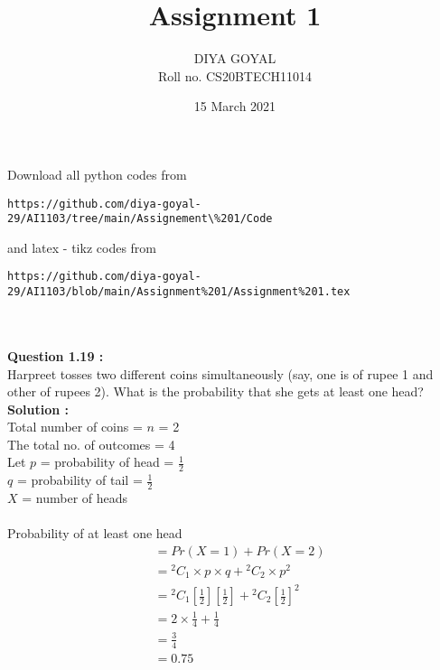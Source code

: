 \documentclass[journal,12pt,twocolumn]{IEEEtran}
\title{Assignment 1}
\author{DIYA GOYAL\\
Roll no. CS20BTECH11014}
\date{15 March 2021}
\newcommand{\fbrack}[2]{\genfrac{[}{]}{}{}{#1}{#2}}
\begin{document}
\maketitle
\large Download all python codes from\\
\begin{lstlisting}
https://github.com/diya-goyal-29/AI1103/tree/main/Assignement\%201/Code
\end{lstlisting}


\large and latex - tikz codes from \\
\begin{lstlisting}
https://github.com/diya-goyal-29/AI1103/blob/main/Assignment%201/Assignment%201.tex
\end{lstlisting}
\\ \\
\large\textbf{Question 1.19 :} \\
Harpreet tosses two different coins simultaneously (say, one is of rupee 1 and other of rupees 2). What is the probability that she gets at least one head? \\
\large\textbf{Solution :}\\
Total number of coins = $n$ = 2\\
The total no. of outcomes = 4\\ 
Let $p$ = probability of head = $\frac{1}{2}$\\
$q$ = probability of tail = $\frac{1}{2}$\\
$X$ = number of heads\\ \\
Probability of at least one head
    \begin{align}
         &= {Pr(X = 1)} + {Pr(X = 2)} \\
         &= {^2 C _1}\times{p}\times{q} + {^2 C _2}\times{p^2}\\
         &= {^2 C _1} \fbrack{1}{2} \fbrack{1}{2} + {^2 C _2} {\fbrack{1}{2}}^2\\ 
         &= 2 \times \frac{1}{4} + \frac{1}{4}\\
         &= \frac{3}{4}\\
         &= 0.75
    \end{align}
\end{document}
